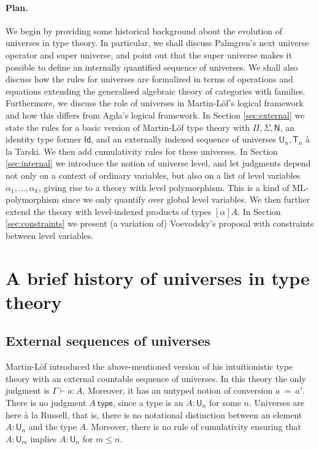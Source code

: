 \documentclass[11pt,a4paper]{article}
\newcommand{\Id}{\mathsf{Id}}
\newcommand{\conv}{=}
\def\NN{\mathsf{N}}
\def\UU{\mathsf{U}}
\newcommand{\type}{\mathsf{type}}
\newcommand{\T}{\mathsf{T}}
\begin{document}
\paragraph{Plan.} We begin by providing some historical background about the evolution of universes in type theory. In particular, we shall discuss Palmgren's next universe operator and super universe, and point out that the super universe makes it possible to define an internally quantified sequence of universes. We shall also discuss how the rules for universes are formalized in terms of operations and equations extending the generalised algebraic theory of categories with families. Furthermore, we discuss the role of universes in Martin-Löf's logical framework and how this differs from Agda's logical framework. In Section \ref{sec:external} we state the rules for a basic version of Martin-Löf type theory with $\Pi, \Sigma, \NN$, an identity type former $\Id$, and an externally indexed sequence of universes $\UU_n, \T_n$ \`a la Tarski. We then add cumulativity rules for these universes. In Section \ref{sec:internal} we introduce the notion of universe level, and let judgments depend not only on a context of ordinary variables, but also on a list of level variables $\alpha_1, \ldots, \alpha_k$, giving rise to a theory with level polymorphism. This is a kind of ML-polymorphism since we only quantify over global level variables. We then further extend the theory with level-indexed products of types $[\alpha]A$. In Section \ref{sec:constraints} we present (a variation of) Voevodsky's proposal with constraints between level variables.



\section{A brief history of universes in type theory}\label{sec:history}

\subsection{External sequences of universes}\label{sec:palmgren}

Martin-Löf \cite{martinlof:predicative} introduced the above-mentioned version of his intuitionistic type theory with an external countable sequence of universes. In this theory the only judgment is  $\Gamma \vdash a : A$. Moreover, it has an untyped notion of conversion $a\ \conv\ a'$. There is no judgment $A\ \type$, since a type is an $A : \UU_n$ for some $n$. Universes are here \`a la Russell, that is, there is no notational distinction between an element $A : \UU_n$ and the type $A$. Moreover, there is no rule of cumulativity ensuring that $A : \UU_m$ implies $A : \UU_n$ for $m \leq n$.
\end{document}
